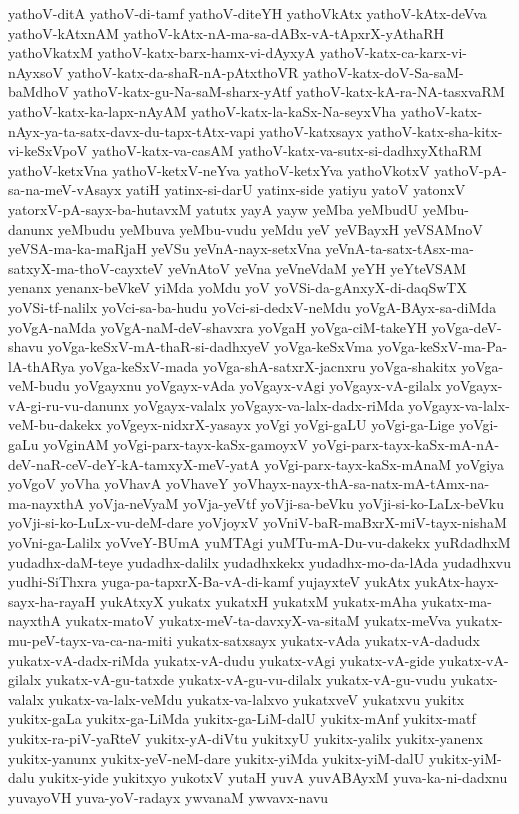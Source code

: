 {yathoV-ditA
yathoV-di-tamf
yathoV-diteYH
yathoVkAtx
yathoV-kAtx-deVva
yathoV-kAtxnAM
yathoV-kAtx-nA-ma-sa-dABx-vA-tApxrX-yAthaRH
yathoVkatxM
yathoV-katx-barx-hamx-vi-dAyxyA
yathoV-katx-ca-karx-vi-nAyxsoV
yathoV-katx-da-shaR-nA-pAtxthoVR
yathoV-katx-doV-Sa-saM-baMdhoV
yathoV-katx-gu-Na-saM-sharx-yAtf
yathoV-katx-kA-ra-NA-tasxvaRM
yathoV-katx-ka-lapx-nAyAM
yathoV-katx-la-kaSx-Na-seyxVha
yathoV-katx-nAyx-ya-ta-satx-davx-du-tapx-tAtx-vapi
yathoV-katxsayx
yathoV-katx-sha-kitx-vi-keSxVpoV
yathoV-katx-va-casAM
yathoV-katx-va-sutx-si-dadhxyXthaRM
yathoV-ketxVna
yathoV-ketxV-neYva
yathoV-ketxYva
yathoVkotxV
yathoV-pA-sa-na-meV-vAsayx
yatiH
yatinx-si-darU
yatinx-side
yatiyu
yatoV
yatonxV
yatorxV-pA-sayx-ba-hutavxM
yatutx
yayA
yayw
yeMba
yeMbudU
yeMbu-danunx
yeMbudu
yeMbuva
yeMbu-vudu
yeMdu
yeV
yeVBayxH
yeVSAMnoV
yeVSA-ma-ka-maRjaH
yeVSu
yeVnA-nayx-setxVna
yeVnA-ta-satx-tAsx-ma-satxyX-ma-thoV-cayxteV
yeVnAtoV
yeVna
yeVneVdaM
yeYH
yeYteVSAM
yenanx
yenanx-beVkeV
yiMda
yoMdu
yoV
yoVSi-da-gAnxyX-di-daqSwTX
yoVSi-tf-nalilx
yoVci-sa-ba-hudu
yoVci-si-dedxV-neMdu
yoVgA-BAyx-sa-diMda
yoVgA-naMda
yoVgA-naM-deV-shavxra
yoVgaH
yoVga-ciM-takeYH
yoVga-deV-shavu
yoVga-keSxV-mA-thaR-si-dadhxyeV
yoVga-keSxVma
yoVga-keSxV-ma-Pa-lA-thARya
yoVga-keSxV-mada
yoVga-shA-satxrX-jacnxru
yoVga-shakitx
yoVga-veM-budu
yoVgayxnu
yoVgayx-vAda
yoVgayx-vAgi
yoVgayx-vA-gilalx
yoVgayx-vA-gi-ru-vu-danunx
yoVgayx-valalx
yoVgayx-va-lalx-dadx-riMda
yoVgayx-va-lalx-veM-bu-dakekx
yoVgeyx-nidxrX-yasayx
yoVgi
yoVgi-gaLU
yoVgi-ga-Lige
yoVgi-gaLu
yoVginAM
yoVgi-parx-tayx-kaSx-gamoyxV
yoVgi-parx-tayx-kaSx-mA-nA-deV-naR-ceV-deY-kA-tamxyX-meV-yatA
yoVgi-parx-tayx-kaSx-mAnaM
yoVgiya
yoVgoV
yoVha
yoVhavA
yoVhaveY
yoVhayx-nayx-thA-sa-natx-mA-tAmx-na-ma-nayxthA
yoVja-neVyaM
yoVja-yeVtf
yoVji-sa-beVku
yoVji-si-ko-LaLx-beVku
yoVji-si-ko-LuLx-vu-deM-dare
yoVjoyxV
yoVniV-baR-maBxrX-miV-tayx-nishaM
yoVni-ga-Lalilx
yoVveY-BUmA
yuMTAgi
yuMTu-mA-Du-vu-dakekx
yuRdadhxM
yudadhx-daM-teye
yudadhx-dalilx
yudadhxkekx
yudadhx-mo-da-lAda
yudadhxvu
yudhi-SiThxra
yuga-pa-tapxrX-Ba-vA-di-kamf
yujayxteV
yukAtx
yukAtx-hayx-sayx-ha-rayaH
yukAtxyX
yukatx
yukatxH
yukatxM
yukatx-mAha
yukatx-ma-nayxthA
yukatx-matoV
yukatx-meV-ta-davxyX-va-sitaM
yukatx-meVva
yukatx-mu-peV-tayx-va-ca-na-miti
yukatx-satxsayx
yukatx-vAda
yukatx-vA-dadudx
yukatx-vA-dadx-riMda
yukatx-vA-dudu
yukatx-vAgi
yukatx-vA-gide
yukatx-vA-gilalx
yukatx-vA-gu-tatxde
yukatx-vA-gu-vu-dilalx
yukatx-vA-gu-vudu
yukatx-valalx
yukatx-va-lalx-veMdu
yukatx-va-lalxvo
yukatxveV
yukatxvu
yukitx
yukitx-gaLa
yukitx-ga-LiMda
yukitx-ga-LiM-dalU
yukitx-mAnf
yukitx-matf
yukitx-ra-piV-yaRteV
yukitx-yA-diVtu
yukitxyU
yukitx-yalilx
yukitx-yanenx
yukitx-yanunx
yukitx-yeV-neM-dare
yukitx-yiMda
yukitx-yiM-dalU
yukitx-yiM-dalu
yukitx-yide
yukitxyo
yukotxV
yutaH
yuvA
yuvABAyxM
yuva-ka-ni-dadxnu
yuvayoVH
yuva-yoV-radayx
ywvanaM
ywvavx-navu
}

